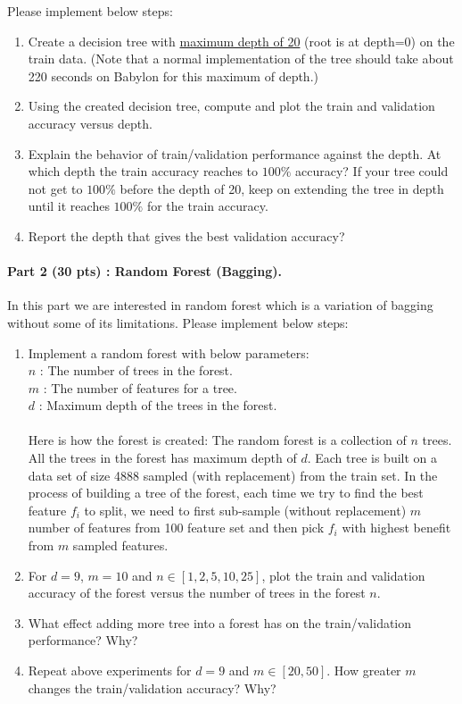 \documentclass{article}
\begin{document}
{\begin{itemize}
\end{itemize}
Please implement below steps:
\begin{enumerate}
    \item Create a decision tree with \underline{maximum depth of 20} (root is at depth=0) on the train data. (Note that a normal implementation of the tree should take about 220 seconds on Babylon for this maximum of depth.) 
    \item Using the created decision tree, compute and plot the train and validation accuracy versus depth.
    \item Explain the behavior of train/validation performance against the depth. At which depth the train accuracy reaches to $100\%$ accuracy? If your tree could not get to $100\%$ before the depth of 20, keep on extending the tree in depth until it reaches $100\%$ for the train accuracy.
    \item Report the depth that gives the best validation accuracy?
\end{enumerate}
\paragraph{Part 2 (30 pts) : Random Forest (Bagging).}
In this part we are interested in random forest which is a variation of bagging without some of its limitations. Please implement below steps:
\begin{enumerate}
    \item Implement a random forest with below parameters:\\
     $n$ : The number of trees in the forest.\\
     $m$ : The number of features for a tree.\\
     $d$ : Maximum depth of the trees in the forest.\\\\
     Here is how the forest is created: The random forest is a collection of $n$ trees. All the trees in the forest has maximum depth of $d$. Each tree is built on a data set of size 4888 sampled (with replacement) from the train set. In the process of building a tree of the forest, each time we try to find the best feature $f_i$ to split, we need to first sub-sample (without replacement) $m$ number of features from 100 feature set and then pick $f_i$ with highest benefit from $m$ sampled features.
    \item For $d=9$, $m=10$ and $n \in [1, 2, 5, 10, 25]$, plot the train and validation accuracy of the forest versus the number of trees in the forest $n$.
    \item What effect adding more tree into a forest has on the train/validation performance? Why?
    \item Repeat above experiments for $d=9$ and $m \in [20, 50]$. How greater $m$ changes the train/validation accuracy? Why?
\end{enumerate}
}
\end{document}
